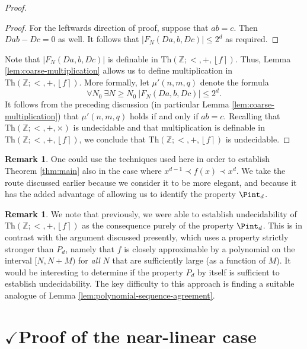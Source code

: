 \documentclass{amsart}
\theoremstyle{definition}
\newtheorem{remark}[theorem]{Remark}
\newcommand{\nint}[1]{\left\lfloor #1 \right\rceil}
\newcommand{\abs}[1]{\left|#1\right|}
\newcommand{\ZZ}{\mathbb{Z}}
\newcommand{\theory}[1]{\mathrm{Th}(#1)}
\begin{document}
\begin{proof}
\begin{proof}
For the leftwards direction of proof, suppose that $ab = c$. Then $Dab - Dc = 0$ as well. It follows that $\abs{F_N(Da, b, Dc)} \leq 2^{d}$ as required.
\end{proof}

Note that $\abs{F_N(Da, b, Dc)}$ is definable in $\theory{\ZZ; <, +, \nint{f}}$. Thus, Lemma \ref{lem:coarse-multiplication} allows us to define multiplication in $\theory{\ZZ; <, +, \nint{f}}$. More formally, let $\mu'(n,m,q)$ denote the formula 
\begin{equation*}
\forall N_0\ \exists N \geq N_0\ \abs{F_N(Da,b,Dc)} \leq 2^{d}.
\end{equation*}
It follows from the preceding discussion (in particular Lemma \ref{lem:coarse-multiplication}) that $\mu'(n,m,q)$ holds if and only if $ab = c$. Recalling that $\theory{\ZZ; <, +, \times}$ is undecidable and that multiplication is definable in $\theory{\ZZ; <, +, \nint{f}}$, we conclude that $\theory{\ZZ; <, +, \nint{f}}$ is undecidable.	
\end{proof}



\begin{remark}
	One could use the techniques used here in order to establish Theorem \ref{thm:main} also in the case where $x^{d-1} \prec f(x) \prec x^d$. We take the route discussed earlier because we consider it to be more elegant, and because it has the added advantage of allowing us to identify the property $\Pint_d$. 
\end{remark}

\begin{remark}
	We note that previously, we were able to establish undecidability of $\theory{\ZZ; <, +, \nint{f}}$ as the consequence purely of the property $\Pint_d$. This is in contrast with the argument discussed presently, which uses a property strictly stronger than $P_d$, namely that $f$ is closely approximable by a polynomial on the interval $[N,N+M)$ for \emph{all} $N$ that are sufficiently large (as a function of $M$). It would be interesting to determine if the property $P_d$ by itself is sufficient to establish undecidability. The key difficulty to this approach is finding a suitable analogue of Lemma \ref{lem:polynomial-sequence-agreement}.
\end{remark}




 


\section{$\checkmark$Proof of the near-linear case}
\end{document}
